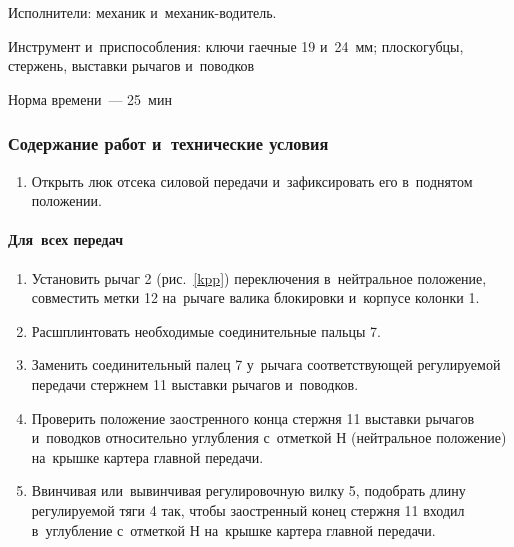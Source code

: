 \noindent
Исполнители: механик и~механик-водитель. 

\noindent
Инструмент и~приспособления: ключи гаечные 19 и~24~мм; плоскогубцы, стержень, выставки рычагов и~поводков 

\noindent
Норма времени~--- 25~мин

\subsubsection{Содержание работ и~технические условия}
\begin{enumerate}
    \item Открыть люк отсека силовой передачи и~зафиксировать его в~поднятом положении. 
\end{enumerate}

\paragraph{Для~всех передач}
\begin{enumerate}
\item Установить рычаг 2 (рис.~\ref{kpp}) переключения в~нейтральное положение, совместить метки 12 на~рычаге валика блокировки и~корпусе колонки 1. 
\item Расшплинтовать необходимые соединительные пальцы 7. 
\item Заменить соединительный палец 7 у~рычага соответствующей регулируемой передачи стержнем 11 выставки рычагов и~поводков. 
\item Проверить положение заостренного конца стержня 11 выставки рычагов и~поводков относительно углубления с~отметкой Н (нейтральное положение) на~крышке картера главной передачи. 
\item Ввинчивая или~вывинчивая регулировочную вилку 5, подобрать длину регулируемой тяги 4 так, чтобы заостренный конец стержня 11 входил в~углубление с~отметкой Н на~крышке картера главной передачи.
\end{enumerate}

    
